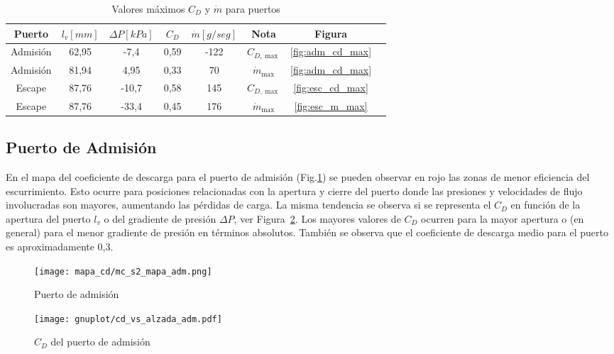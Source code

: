 \begin{table}[h]
  \centering
  \begin{tabular}{cccccccc}\toprule
    Puerto & $l_{v} [mm]$ & $\Delta P [kPa]$ & $C_{D}$ & $\dot{m} [g/seg]$ & Nota & Figura\\ \midrule
    Admisión & 62,95 &  -7,4 & 0,59  & -122 & $C_{D,\max}$ &\ref{fig:adm_cd_max} \\
    Admisión & 81,94 &  4,95 & 0,33 &   70 & $\dot{m}_{\max}$ &\ref{fig:adm_cd_max} \\
    Escape   & 87,76 & -10,7 & 0,58 &  145 & $C_{D,\max}$ &\ref{fig:esc_cd_max}\\
    Escape   & 87,76 & -33,4 & 0,45 &  176 & $\dot{m}_{\max}$ &\ref{fig:esc_m_max}\\
  \end{tabular}
  \caption{Valores máximos $C_{D}$ y $\dot{m}$ para puertos}\label{tab:resumen_puertos}
\end{table}


\subsection{Puerto de Admisión}
%
En el mapa del coeficiente de descarga  para el puerto de admisión
(Fig.\ref{fig:mapa_cd_admision}) se pueden observar en rojo las zonas de menor
eficiencia del escurrimiento.
%
Esto ocurre para posiciones relacionadas con la apertura y cierre del puerto
donde las presiones y velocidades de flujo involucradas son mayores, aumentando
las pérdidas de carga.
%
La misma tendencia se observa si se representa el $C_{D}$ en función de la
apertura del puerto $l_{v}$ o del gradiente de presión $\Delta P$, ver
Figura~\ref{fig:cd_admision}.
%
Los mayores valores de $C_{D}$ ocurren para la mayor apertura o (en general)
para el menor gradiente de presión en términos absolutos.
%
También se observa que el coeficiente de descarga medio para el puerto es
aproximadamente 0,3.

\begin{figure}[h]
    \centering
    \texttt{[image: mapa\_cd/mc\_s2\_mapa\_adm.png]}
    \caption{Puerto de admisión}\label{fig:mapa_cd_admision}
\end{figure}

\begin{figure}[h]
    \centering
    \texttt{[image: gnuplot/cd\_vs\_alzada\_adm.pdf]}
    \caption{$C_{D}$ del puerto de admisión}\label{fig:cd_admision}
\end{figure}

